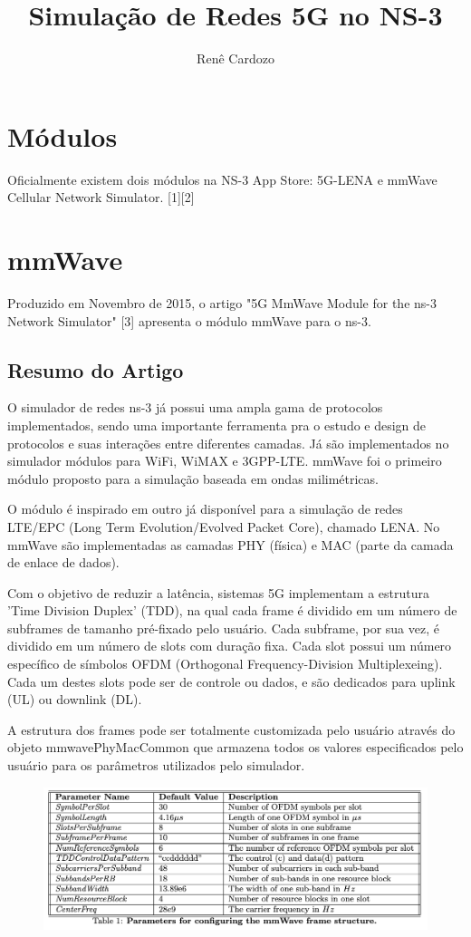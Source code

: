 \documentclass{article}
\title{Simulação de Redes 5G no NS-3}
\author{Renê Cardozo}
\date{}
\begin{document}
\maketitle
\section{Módulos}
Oficialmente existem dois módulos na NS-3 App Store: 5G-LENA e mmWave Cellular Network Simulator. [1][2]

\section{mmWave}
Produzido em Novembro de 2015, o artigo "5G MmWave Module for the ns-3 Network Simulator" [3] apresenta o módulo mmWave para o ns-3.

\subsection{Resumo do Artigo}
O simulador de redes ns-3 já possui uma ampla gama de protocolos implementados, sendo uma importante ferramenta pra o estudo e design de protocolos e suas interações entre diferentes camadas. Já são implementados no simulador módulos para WiFi, WiMAX e 3GPP-LTE. mmWave foi o primeiro módulo proposto para a simulação baseada em ondas milimétricas.

O módulo é inspirado em outro já disponível para a simulação de redes LTE/EPC (Long Term Evolution/Evolved Packet Core), chamado LENA. No mmWave são implementadas as camadas PHY (física) e MAC (parte da camada de enlace de dados).

Com o objetivo de reduzir a latência, sistemas 5G implementam a estrutura 'Time Division Duplex' (TDD), na qual cada frame é dividido em um número de subframes de tamanho pré-fixado pelo usuário. Cada subframe, por sua vez, é dividido em um número de slots com duração fixa. Cada slot possui um número específico de símbolos OFDM (Orthogonal Frequency-Division Multiplexeing). Cada um destes slots pode ser de controle ou dados, e são dedicados para uplink (UL) ou downlink (DL). 

A estrutura dos frames pode ser totalmente customizada pelo usuário através do objeto mmwavePhyMacCommon que armazena todos os valores especificados pelo usuário para os parâmetros utilizados pelo simulador.

\begin{figure}[!h]
\includegraphics[width=\textwidth]{tabela-parametros-frame}
\centering
\end{figure}
\end{document}
